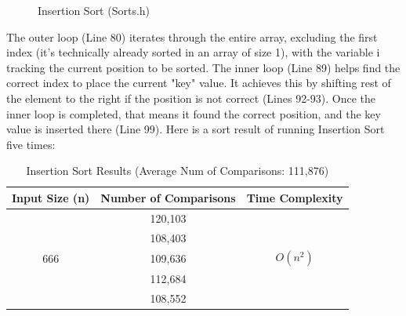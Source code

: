\documentclass[letterpaper, 10pt]{article}
\begin{document}
\begin{figure}[H]
  \centering
  
  \caption{Insertion Sort (Sorts.h)}
  \label{fig:figure4.4-part2}
\end{figure}

\noindent
The outer loop (Line 80) iterates through the entire array, excluding the first index (it's technically already sorted in an array of size 1), with the variable i tracking the current position to be sorted. The inner loop (Line 89) helps find the correct index to place the current "key" value. It achieves this by shifting rest of the element to the right if the position is not correct (Lines 92-93). Once the inner loop is completed, that means it found the correct position, and the key value is inserted there (Line 99). 
Here is a sort result of running Insertion Sort five times:
\begin{table}[H]
\centering
\begin{tabular}{|c|c|c|}
\hline
\textbf{Input Size (n)} & \textbf{Number of Comparisons} & \textbf{Time Complexity} \\
\hline
\multirow{5}{*}{666} & 120,103 & \\
                     & 108,403 & \\
                     & 109,636 & $O(n^2)$ \\
                     & 112,684 & \\
                     & 108,552 & \\
\hline
\end{tabular}
\caption{Insertion Sort Results (Average Num of Comparisons: 111,876)}
\end{table}
\end{document}
